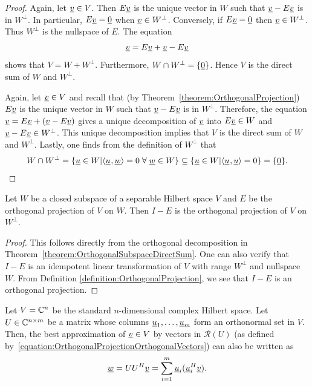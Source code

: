 \begin{proof}
Again, let $\underline{v} \in V$.
Then $E \underline{v}$ is the unique vector in $W$ such that $\underline{v} - E \underline{v}$ is in $W^{\bot}$.
In particular, $E \underline{v} = \underline{0}$ when $\underline{v} \in W^{\bot}$.
Conversely, if $E \underline{v} = \underline{0}$ then $\underline{v} \in W^{\bot}$.
Thus $W^{\bot}$ is the nullspace of $E$.
The equation
\begin{equation*}
\underline{v} = E \underline{v} + \underline{v} - E \underline{v}
\end{equation*}
shows that $V = W + W^{\bot}$.
Furthermore, $W \cap W^{\bot} = \left\{ \underline{0} \right\}$.
Hence $V$ is the direct sum of $W$ and $W^{\bot}$.
\fi

Again, let $\underline{v} \in V$ and recall that (by Theorem~\ref{theorem:OrthogonalProjection}) $E \underline{v}$ is the unique vector in $W$ such that $\underline{v} - E \underline{v}$ is in $W^{\bot}$.
Therefore, the equation $\underline{v} = E \underline{v} + \left( \underline{v} - E \underline{v} \right)$ gives a unique decomposition of $\underline{v}$ into $E \underline{v} \in W$ and $\underline{v} - E \underline{v} \in W^{\bot}$.
This unique decomposition implies that $V$ is the direct sum of $W$ and $W^{\bot}$.
Lastly, one finds from the definition of $W^{\bot}$ that
\[W \cap W^{\bot} = \left\{ \underline{u} \in W | {\langle  \underline{u}  \mskip1mu ,  \underline{w}  \rangle} =0 \; \forall \; \underline{w}\in W \right\}  \subseteq \left\{ \underline{u} \in W | {\langle  \underline{u}  \mskip1mu ,  \underline{u}  \rangle} =0 \right\}  = \{ \underline{0} \} . \qedhere \]
\end{proof}

\begin{corollary}
Let $W$ be a closed subspace of a separable Hilbert space $V$ and $E$ be the orthogonal projection of $V$ on $W$.
Then $I - E$ is the orthogonal projection of $V$ on $W^{\bot}$.
\end{corollary}
\begin{proof}
This follows directly from the orthogonal decomposition in Theorem~\ref{theorem:OrthogonalSubspaceDirectSum}.
One can also verify that $I-E$ is an idempotent linear transformation of $V$ with range $W^{\bot}$ and nullspace $W$.
From Definition \ref{definition:OrthogonalProjection}, we see that $I-E$ is an orthogonal projection.
\end{proof}

\begin{example}
Let $V = \mathbb{C}^n$ be the standard $n$-dimensional complex Hilbert space.
Let $U \in \mathbb{C}^{n\times m}$ be a matrix whose columns $\underline{u}_1,\ldots,\underline{u}_m$ form an orthonormal set in $V$.
Then, the best approximation of $\underline{v}\in V$ by vectors in $\mathcal{R}(U)$ (as  defined by~\eqref{equation:OrthogonalProjectionOrthogonalVectors}) can also be written as
\[ \underline{w} = U U^H \underline{v} = \sum_{i=1}^m \underline{u}_i (\underline{u}_i^H \underline{v}). \]
\end{example}

